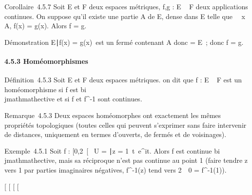 \documentclass[]{article}
\begin{document}
Corollaire~4.5.7 Soit E et F deux espaces métriques, f,g : E \rightarrow~ F deux
applications continues. On suppose qu'il existe une partie A de E, dense
dans E telle que \forall~~x \in A, f(x) = g(x). Alors f
= g.

Démonstration \x \in E∣f(x) =
g(x)\ est un fermé contenant A donc
\overlineA = E~; donc f = g.

\paragraph{4.5.3 Homéomorphismes}

Définition~4.5.3 Soit E et F deux espaces métriques. on dit que f : E \rightarrow~
F est un homéomorphisme si f est bi\\jmathmathective et si f et f^-1
sont continues.

Remarque~4.5.3 Deux espaces homéomorphes ont exactement les mêmes
propriétés topologiques (toutes celles qui peuvent s'exprimer sans faire
intervenir de distances, uniquement en termes d'ouverts, de fermés et de
voisinages).

Exemple~4.5.1 Soit f : {[}0,2\pi~{[}\rightarrow~ U = \z \in
{}∣z =
1\, t\mapsto~e^it. Alors
f est continue bi\\jmathmathective, mais sa réciproque n'est pas continue au point
1 (faire tendre z vers 1 par parties imaginaires négatives,
f^-1(z) tend vers 2\pi~\neq~0 =
f^-1(1)).

{[}
{[}
{[}
{[}
\end{document}
